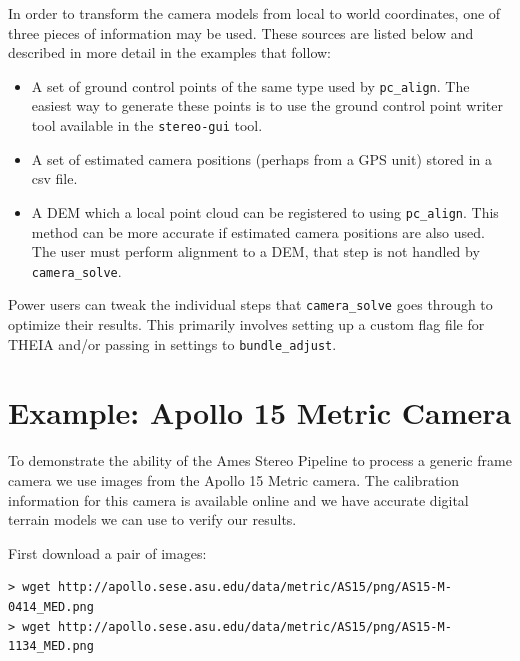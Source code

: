 In order to transform the camera models from local to world coordinates,
one of three pieces of information may be used.  These sources are listed
below and described in more detail in the examples that follow:
\begin{itemize}{}
\item A set of ground control points of the same type used by \texttt{pc\_align}.
The easiest way to generate these points is to use the ground control point
writer tool available in the \texttt{stereo-gui} tool.
\item A set of estimated camera positions (perhaps from a GPS unit) stored in
a csv file.
\item A DEM which a local point cloud can be registered to using \texttt{pc\_align}.
This method can be more accurate if estimated camera positions are also used.  The user
must perform alignment to a DEM, that step is not handled by \texttt{camera\_solve}.
\end{itemize}{}

Power users can tweak the individual steps that \texttt{camera\_solve} goes through
to optimize their results.  This primarily involves setting up a custom flag file for
THEIA and/or passing in settings to \texttt{bundle\_adjust}.

\section{Example: Apollo 15 Metric Camera}
\label{sfm:generic}

To demonstrate the ability of the Ames Stereo Pipeline to process a
generic frame camera we use images from the Apollo 15 Metric camera.  The
 calibration information for this camera is available online and we have accurate
 digital terrain models we can use to verify our results.

First download a pair of images:

\begin{verbatim}
> wget http://apollo.sese.asu.edu/data/metric/AS15/png/AS15-M-0414_MED.png
> wget http://apollo.sese.asu.edu/data/metric/AS15/png/AS15-M-1134_MED.png
\end{verbatim}

